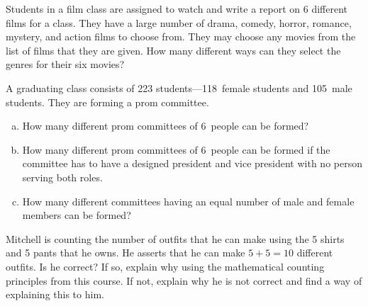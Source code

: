 \documentclass[11pt,letterpaper]{article}
\begin{document}
\newpage



 Students in a film class are assigned to watch and write a report on 6 different films for a class. They have a large number of drama, comedy, horror, romance, mystery, and action films to choose from. They may choose any movies from the list of films that they are given. How many different ways can they select the genres for their six movies?



\newpage



 A graduating class consists of 223 students---118~female students and 105~male students. They are forming a prom committee. 
	\begin{enumerate}[(a)]
	\item How many different prom committees of 6~people can be formed?
	\item How many different prom committees of 6~people can be formed if the committee has to have a designed president and vice president with no person serving both roles. 
	\item How many different committees having an equal number of male and female members can be formed?
	\end{enumerate}



\newpage



 Mitchell is counting the number of outfits that he can make using the 5 shirts and 5 pants that he owns. He asserts that he can make $5 + 5= 10$ different outfits. Is he correct? If so, explain why using the mathematical counting principles from this course. If not, explain why he is not correct and find a way of explaining this to him. 
\end{document}
